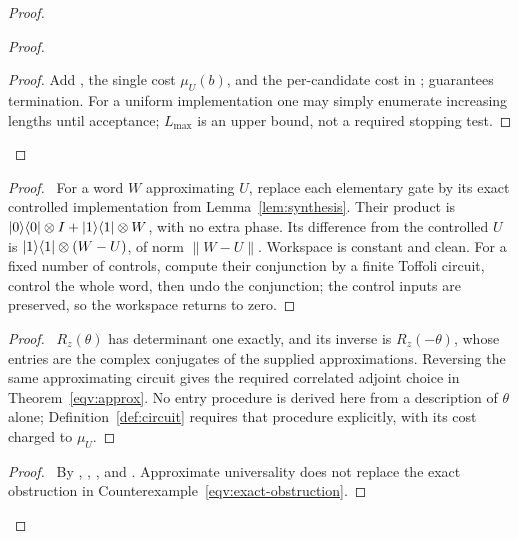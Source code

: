 \begin{proof}
\begin{proof}
\begin{proof}
  Add , the single cost $\mu_U(b)$,
  and the per-candidate cost in ;
   guarantees termination. For a uniform
  implementation one may simply enumerate increasing lengths until
  acceptance; $L_{\max}$ is an upper bound, not a required stopping test.
  \end{proof}
 \end{proof}
 \begin{proof}\pf\ For a word $W$ approximating $U$, replace each
 elementary gate by its exact controlled implementation from
 Lemma~\ref{lem:synthesis}. Their product is
 $\lvert 0\rangle\langle 0\rvert\otimes I+\lvert 1\rangle\langle 1\rvert\otimes W$, with no extra phase.
 Its difference from the controlled $U$ is
 $\lvert 1\rangle\langle 1\rvert\otimes(W-U)$, of norm $\|W-U\|$.
 Workspace is constant and clean. For a fixed number of controls,
 compute their conjunction by a finite Toffoli circuit, control
 the whole word, then undo the conjunction; the control inputs
 are preserved, so the workspace returns to zero.\end{proof}
 \begin{proof}\pf\ $R_z(\theta)$ has determinant one exactly, and its inverse is $R_z(-\theta)$, whose entries are the complex conjugates of the supplied approximations. Reversing the same approximating circuit gives the required correlated adjoint choice in Theorem~\ref{eqv:approx}. No entry procedure is derived here from a description of $\theta$ alone; Definition~\ref{def:circuit} requires that procedure explicitly, with its cost charged to $\mu_U$.\end{proof}
 \qedstep
 \begin{proof}\pf\ By ,
 , , and
 . Approximate universality does not replace
 the exact obstruction in Counterexample~\ref{eqv:exact-obstruction}.
\end{proof}
\end{proof}

